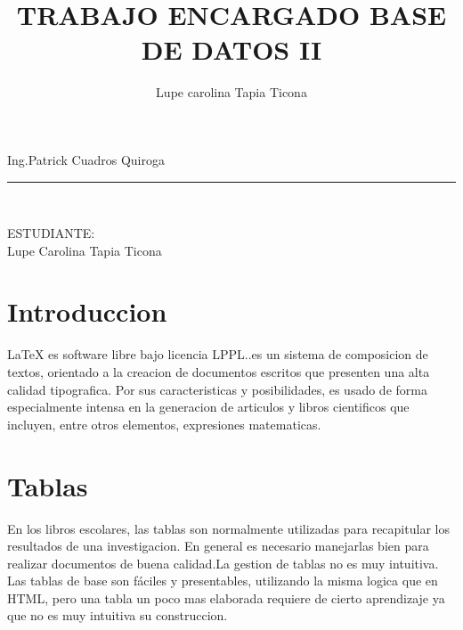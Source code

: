 \documentclass[12pt,letterpaper]{article}
\begin{document}
\begin{titlepage}
\begin{center}
\vspace*{0.1in}
\begin{large}
Ing.Patrick Cuadros Quiroga\\
\end{large}


\vspace*{0.3in}
\rule{80mm}{0.1mm}\\


\vspace*{0.1in}
\begin{large}
ESTUDIANTE: \\
Lupe Carolina Tapia Ticona\\
\end{large}



\end{center}
\end{titlepage}





\tableofcontents
 \newpage
\listoftables
 \newpage
\listoffigures




\title{TRABAJO ENCARGADO BASE DE DATOS II} 
\author{Lupe carolina Tapia Ticona} 
\maketitle 
\section{Introduccion} 
LaTeX es software libre bajo licencia LPPL..es un sistema de composicion de textos, 
orientado a la creacion de documentos escritos que presenten una alta calidad tipografica. 
Por sus caracteristicas y posibilidades, es usado de forma especialmente intensa en la generacion 
de articulos y libros cientificos que incluyen, entre otros elementos, expresiones matematicas.




\section{Tablas} 
En los libros escolares, las tablas son normalmente utilizadas para recapitular los resultados
 de una investigacion. En general es necesario manejarlas bien para realizar documentos de buena calidad.La gestion de tablas no es muy intuitiva. Las tablas de base son fáciles y presentables, utilizando la misma logica que
  en HTML, pero una tabla un poco mas elaborada requiere de cierto aprendizaje ya que no es muy intuitiva su construccion.
  
\end{document}
